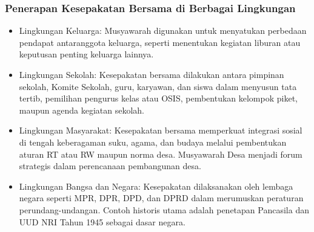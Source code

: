 \subsubsection{Penerapan Kesepakatan Bersama di Berbagai Lingkungan}
\begin{itemize}
\item Lingkungan Keluarga: Musyawarah digunakan untuk menyatukan perbedaan pendapat antaranggota keluarga, seperti menentukan kegiatan liburan atau keputusan penting keluarga lainnya.
\item Lingkungan Sekolah: Kesepakatan bersama dilakukan antara pimpinan sekolah, Komite Sekolah, guru, karyawan, dan siswa dalam menyusun tata tertib, pemilihan pengurus kelas atau OSIS, pembentukan kelompok piket, maupun agenda kegiatan sekolah.
\item Lingkungan Masyarakat: Kesepakatan bersama memperkuat integrasi sosial di tengah keberagaman suku, agama, dan budaya melalui pembentukan aturan RT atau RW maupun norma desa. Musyawarah Desa menjadi forum strategis dalam perencanaan pembangunan desa.
\item Lingkungan Bangsa dan Negara: Kesepakatan dilaksanakan oleh lembaga negara seperti MPR, DPR, DPD, dan DPRD dalam merumuskan peraturan perundang-undangan. Contoh historis utama adalah penetapan Pancasila dan UUD NRI Tahun 1945 sebagai dasar negara.
\end{itemize}
